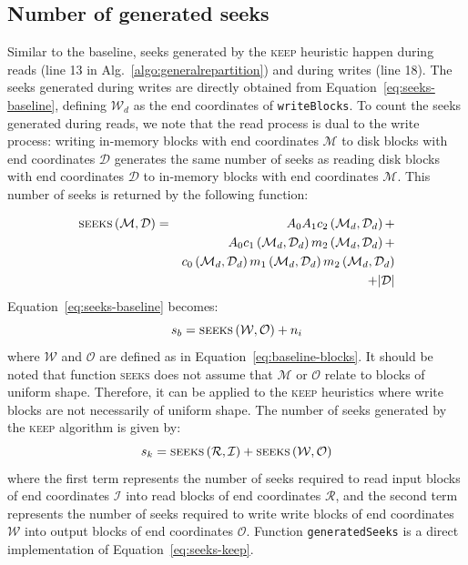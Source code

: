 \documentclass[sigconf, nonacm]{acmart}
\newcommand{\keep}[0]{\textsc{keep}\xspace}
\begin{document}
\subsection{Number of generated seeks}

Similar to the
baseline, seeks generated by the \keep heuristic happen during reads (line
13 in Alg.~\ref{algo:generalrepartition}) and during writes (line 18). The
seeks generated during writes are directly obtained from
Equation~\ref{eq:seeks-baseline}, defining $\mathcal{W}_d$ as the end coordinates of
\texttt{writeBlocks}. To count the seeks generated
during reads, we note that the read process is dual to the write process:
writing in-memory blocks with end coordinates $\mathcal{M}$ to disk blocks
with end coordinates $\mathcal{D}$ generates the same number of seeks as
reading disk blocks with end coordinates $\mathcal{D}$ to in-memory blocks
with end coordinates $\mathcal{M}$. This number of seeks is returned by the following function:

\begin{eqnarray*}
  \textsc{seeks} \left(  \mathcal{M}, \mathcal{D} \right) &=&  A_0 A_1 c_2\left(\mathcal{M}_d, \mathcal{D}_d\right) + \\
                                                         &&  A_0 c_1\left(\mathcal{M}_d, \mathcal{D}_d\right) m_2\left(\mathcal{M}_d, \mathcal{D}_d\right) +\\
                                                         && c_0\left(\mathcal{M}_d, \mathcal{D}_d\right) m_1\left(\mathcal{M}_d, \mathcal{D}_d\right) m_2\left(\mathcal{M}_d, \mathcal{D}_d \right)\\
                                                         && + \vert \mathcal{D} \vert
\end{eqnarray*}
Equation~\ref{eq:seeks-baseline} becomes:
\[
  s_b = \textsc{seeks} \left( \mathcal{W}, \mathcal{O} \right) + n_i
\]
where $\mathcal{W}$ and $\mathcal{O}$ are defined as in
Equation~\ref{eq:baseline-blocks}. It should be noted that function
\textsc{seeks} does not assume that $\mathcal{M}$ or $\mathcal{O}$ relate to
blocks of uniform shape. Therefore, it can be applied to the \keep
heuristics where write blocks are not necessarily of uniform shape.
The number of seeks generated by the \keep algorithm is given by:
\begin{equation}
  s_k = \textsc{seeks} \left(  \mathcal{R}, \mathcal{I} \right) + \textsc{seeks} \left( \mathcal{W}, \mathcal{O} \right) \label{eq:seeks-keep}
\end{equation}
where the first term represents the number of seeks required to read input
 blocks of end coordinates $\mathcal{I}$ into read blocks of end
 coordinates $\mathcal{R}$, and the second term represents the number of
 seeks required to write write blocks of end coordinates $\mathcal{W}$ into
 output blocks of end coordinates $\mathcal{O}$. Function
 \texttt{generatedSeeks} is
 a direct implementation of Equation~\ref{eq:seeks-keep}.
\end{document}

